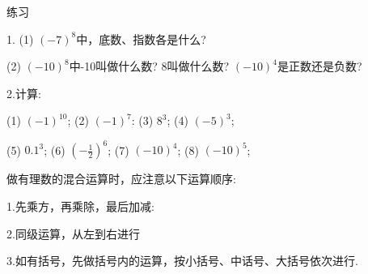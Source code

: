 \documentclass{article}
\begin{document}
\begin{exercise}
练习

1. (1) $(-7)^8$中，底数、指数各是什么?

(2) $(-10)^8$中-10叫做什么数? 8叫做什么数? $(-10)^4$是正数还是负数?

2.计算:

(1) $(-1)^10$;  (2) $(-1)^7$:  (3) $8^3$;  (4) $(-5)^3$;

(5) $0.1^3$;    (6) $(-\frac{1}{2})^6$; (7) $(-10)^4$; (8) $(-10)^5$;
\end{exercise}

做有理数的混合运算时，应注意以下运算顺序:

1.先乘方，再乘除，最后加减:

2.同级运算，从左到右进行

3.如有括号，先做括号内的运算，按小括号、中话号、大括号依次进行.
\end{document}
